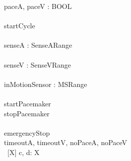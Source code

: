 \begin{circus}
  \circchannel paceA, paceV : BOOL\\

  \\

  \circchannel startCycle \\

  \\

  \circchannel senseA :  SenseARange\\

  \\

  \circchannel senseV :  SenseVRange\\

  \\
    
  \circchannel inMotionSensor : MSRange\\
  
  \\

  \circchannel startPacemaker \\
  \circchannel stopPacemaker \\

  \\
  
  \circchannel emergencyStop \\
  
  \circchannel timeoutA, timeoutV, noPaceA, noPaceV\\
  
  \circchannel\ [X] c, d: X 
  
\end{circus}





